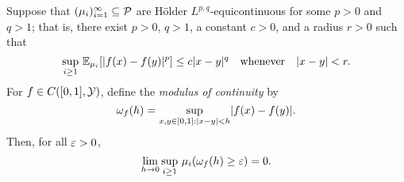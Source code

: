 \documentclass[12pt]{report}
\begin{document}
\begin{lemma} \label{lem:modulus_continuity}
    Suppose that $(\mu_i)_{i=1}^\infty \subseteq \mathcal{P}$ are H\"older $L^{p,q}$-equicontinuous for some $p > 0$ and $q > 1$;
    that is, there exist $p > 0$, $q > 1$, a constant $c > 0$, and a radius $r > 0$ such that
    \begin{equation}
        \operatorname*{sup}_{i \ge 1}\,
        \mathbb{E}_{\mu_i}[\lvert f(x) - f(y)\rvert^p] \le c \lvert x - y\rvert^q
        \quad\text{whenever}\quad
        \lvert x - y\rvert < r.
    \end{equation}
    For $f \in C([0, 1], \mathcal{Y})$, define the \emph{modulus of continuity} by
    \begin{equation}
        \omega_f(h)
        = \operatorname*{sup}_{x, y \in [0, 1]: \lvert x - y\rvert < h} \lvert f(x) - f(y)\rvert.
    \end{equation}
    Then, for all $\varepsilon > 0$,
    \begin{equation}
        \lim_{h \to 0} \operatorname*{sup}_{i \ge 1}\, \mu_i(\omega_f(h) \ge \varepsilon) = 0.
    \end{equation}
\end{lemma}
\end{document}
